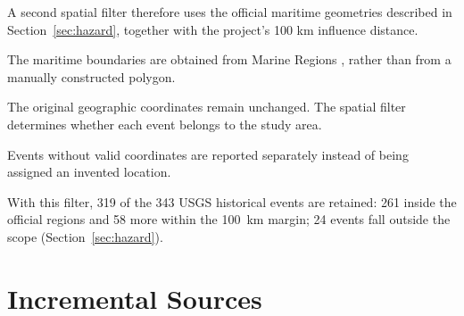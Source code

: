 \documentclass[a4paper,11pt,oneside]{book}
\begin{document}
A second spatial filter therefore uses the official maritime
geometries described in Section~\ref{sec:hazard}, together
with the project's 100 km influence distance.

The maritime boundaries are obtained from Marine Regions
\cite{marineregions}, rather than from a manually constructed
polygon.

The original geographic coordinates remain unchanged.
The spatial filter determines whether each event belongs
to the study area.

Events without valid coordinates are reported separately
instead of being assigned an invented location.

With this filter, 319 of the 343 USGS historical events are retained: 261 inside the official regions and 58 more within the 100~km margin; 24 events fall outside the scope (Section~\ref{sec:hazard}).

\section{Incremental Sources}
\label{sec:incremental}
\end{document}
